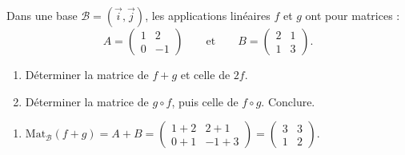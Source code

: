 \documentclass[11pt]{article}
\begin{document}
\begin{exoresolu}
Dans une base $\mathcal{B}=(\vec{i},\vec{j})$, les applications linéaires $f$ et $g$ ont pour matrices :
\[ A=\begin{pmatrix} 1 & 2 \\ 0 & -1 \end{pmatrix} \qquad \text{et} \qquad B=\begin{pmatrix} 2 & 1 \\ 1 & 3 \end{pmatrix}. \]
\begin{enumerate}
\item Déterminer la matrice de $f+g$ et celle de $2f$.
\item Déterminer la matrice de $g\circ f$, puis celle de $f\circ g$. Conclure.
\end{enumerate}
\tcblower
\begin{enumerate}
\item $\mathrm{Mat}_{\mathcal{B}}(f+g)=A+B=\begin{pmatrix} 1+2 & 2+1 \\ 0+1 & -1+3 \end{pmatrix}=\begin{pmatrix} 3 & 3 \\ 1 & 2 \end{pmatrix}$.


\end{enumerate}
\end{exoresolu}
\end{document}
